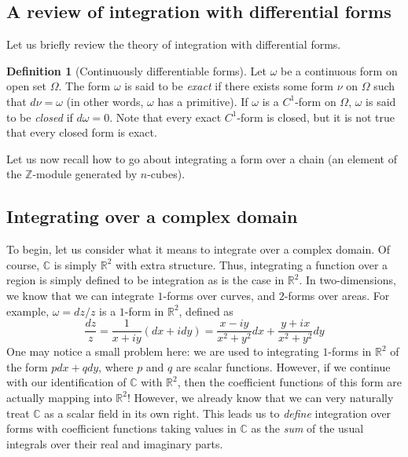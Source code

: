 \documentclass[aps,pra,showpacs,notitlepage,onecolumn,superscriptaddress,nofootinbib]{revtex4-1}
\theoremstyle{definition}
\newtheorem{definition}{Definition}[section]
\begin{document}
\subsection{A review of integration with differential forms}

\noindent Let us briefly review the theory of integration with differential forms.

\begin{definition}[Continuously differentiable forms]
  Let $\omega$ be a continuous form on open set $\Omega$. The form $\omega$ is said to be \emph{exact} if there exists some form $\nu$ on $\Omega$ such that $d\nu = \omega$ (in other words,
  $\omega$ has a primitive). If $\omega$ is a $C^1$-form on $\Omega$, $\omega$ is said to be \emph{closed} if $d\omega = 0$. Note that every exact $C^1$-form is closed, but it is not true that every closed form is exact.
\end{definition}

\noindent Let us now recall how to go about integrating a form over a chain (an element of the $\mathbb{Z}$-module generated by $n$-cubes).

\subsection{Integrating over a complex domain}

\noindent To begin, let us consider what it means to integrate over a complex domain. Of course, $\mathbb{C}$ is simply $\mathbb{R}^2$ with extra structure. Thus, integrating a function
over a region is simply defined to be integration as is the case in $\mathbb{R}^2$. In two-dimensions, we know that we can integrate $1$-forms over curves, and $2$-forms over areas. For example,
$\omega = dz/z$ is a $1$-form in $\mathbb{R}^2$, defined as
\begin{equation}
  \frac{dz}{z} = \frac{1}{x + iy} (dx + i dy) = \frac{x - i y}{x^2 + y^2} dx + \frac{y + i x}{x^2 + y^2} dy
\end{equation}
One may notice a small problem here: we are used to integrating $1$-forms in $\mathbb{R}^2$ of the form $p dx + q dy$, where $p$ and $q$ are scalar functions. However,
if we continue with our identification of $\mathbb{C}$ with $\mathbb{R}^2$, then the coefficient functions of this form are actually mapping into $\mathbb{R}^2$! However, we already know
that we can very naturally treat $\mathbb{C}$ as a scalar field in its own right. This leads us to \emph{define} integration over forms with coefficient functions taking values in $\mathbb{C}$
as the \emph{sum} of the usual integrals over their real and imaginary parts.
\newline
\end{document}
